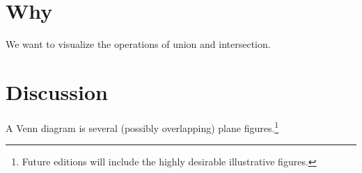 

\section*{Why}

We want to visualize the operations of union and intersection.

\section*{Discussion}

A Venn diagram is several (possibly overlapping) plane figures.\footnote{Future editions will include the highly desirable illustrative figures.}

\blankpage